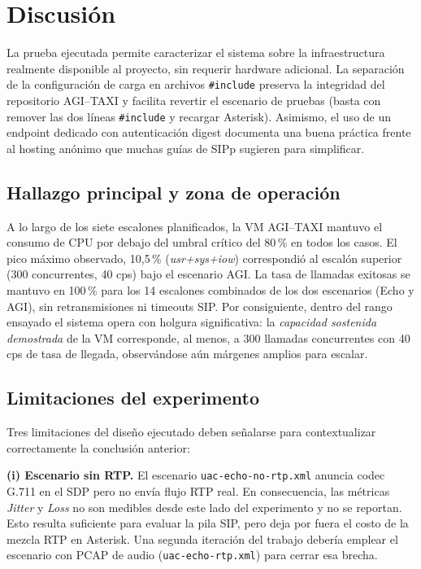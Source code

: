 \documentclass[conference]{IEEEtran}
\begin{document}
\section{Discusi\'on}
\label{sec:discusion}

La prueba ejecutada permite caracterizar el sistema sobre la
infraestructura realmente disponible al proyecto, sin requerir
hardware adicional. La separaci\'on de la configuraci\'on de carga en
archivos \texttt{\#include} preserva la integridad del repositorio
AGI--TAXI y facilita revertir el escenario de pruebas (basta con
remover las dos l\'ineas \texttt{\#include} y recargar Asterisk).
Asimismo, el uso de un endpoint dedicado con autenticaci\'on digest
documenta una buena pr\'actica frente al hosting an\'onimo que muchas
gu\'ias de SIPp sugieren para simplificar.

\subsection{Hallazgo principal y zona de operaci\'on}

A lo largo de los siete escalones planificados, la VM AGI--TAXI mantuvo
el consumo de CPU por debajo del umbral cr\'itico del 80\,\% en todos
los casos. El pico m\'aximo observado, 10{,}5\,\% (\textit{usr+sys+iow})
correspondi\'o al escal\'on superior (300 concurrentes, 40 cps) bajo el
escenario AGI. La tasa de llamadas exitosas se mantuvo en 100\,\% para
los 14 escalones combinados de los dos escenarios (Echo y AGI), sin
retransmisiones ni timeouts SIP. Por consiguiente, dentro del rango
ensayado el sistema opera con holgura significativa: la \textit{capacidad
sostenida demostrada} de la VM corresponde, al menos, a 300 llamadas
concurrentes con 40 cps de tasa de llegada, observ\'andose a\'un
m\'argenes amplios para escalar.

\subsection{Limitaciones del experimento}

Tres limitaciones del dise\~no ejecutado deben se\~nalarse para
contextualizar correctamente la conclusi\'on anterior:

\textbf{(i) Escenario sin RTP.} El escenario \texttt{uac-echo-no-rtp.xml}
anuncia codec G.711 en el SDP pero no env\'ia flujo RTP real. En
consecuencia, las m\'etricas \textit{Jitter} y \textit{Loss} no son
medibles desde este lado del experimento y no se reportan. Esto resulta
suficiente para evaluar la pila SIP, pero deja por fuera el costo de la
mezcla RTP en Asterisk. Una segunda iteraci\'on del trabajo deber\'ia
emplear el escenario con PCAP de audio (\texttt{uac-echo-rtp.xml}) para
cerrar esa brecha.
\end{document}
